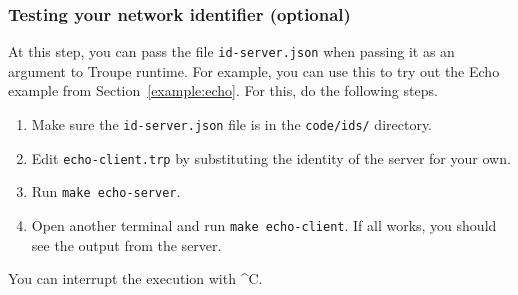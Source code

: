 \subsubsection{Testing your network identifier (optional)}
At this step, you can pass the file \verb+id-server.json+ 
when passing it as an argument to Troupe runtime. For example,
you can use this to try out the Echo example from Section~\ref{example:echo}. For this,
do the following steps.
\begin{enumerate}
\item Make sure the {\tt id-server.json} file is in the {\tt code/ids/} directory.
\item Edit {\tt echo-client.trp} by substituting the identity of the server for your own.
\item Run {\tt make echo-server}.
\item Open another terminal and run {\tt make echo-client}. If all works, you should see the output from the server.
\end{enumerate}
You can interrupt the execution with \^{}C.


